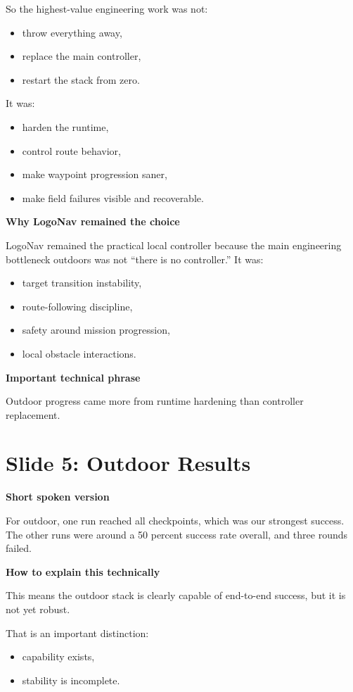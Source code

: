 \documentclass[11pt]{article}
\begin{document}
So the highest-value engineering work was not:
\begin{itemize}[leftmargin=*]
\item throw everything away,
\item replace the main controller,
\item restart the stack from zero.
\end{itemize}

It was:
\begin{itemize}[leftmargin=*]
\item harden the runtime,
\item control route behavior,
\item make waypoint progression saner,
\item make field failures visible and recoverable.
\end{itemize}

\textbf{Why LogoNav remained the choice}

LogoNav remained the practical local controller because the main engineering bottleneck outdoors was not ``there is no controller.'' It was:
\begin{itemize}[leftmargin=*]
\item target transition instability,
\item route-following discipline,
\item safety around mission progression,
\item local obstacle interactions.
\end{itemize}

\textbf{Important technical phrase}

Outdoor progress came more from runtime hardening than controller replacement.

\section*{Slide 5: Outdoor Results}
\textbf{Short spoken version}

For outdoor, one run reached all checkpoints, which was our strongest success. The other runs were around a 50 percent success rate overall, and three rounds failed.

\textbf{How to explain this technically}

This means the outdoor stack is clearly capable of end-to-end success, but it is not yet robust.

That is an important distinction:
\begin{itemize}[leftmargin=*]
\item capability exists,
\item stability is incomplete.
\end{itemize}
\end{document}

